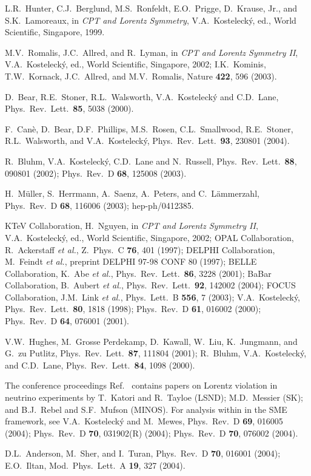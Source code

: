 \documentclass[twocolumn]{revtex4}
\def\etal {{\it et al.}}
\begin{document}
\begin{thebibliography}{99}
L.R.\ Hunter, C.J.\ Berglund, M.S.\ Ronfeldt, E.O.\ Prigge,
D.\ Krause, Jr., and S.K.\ Lamoreaux,
in
{\it CPT and Lorentz Symmetry},
V.A.\ Kosteleck\'y, ed.,
World Scientific, Singapore, 1999.

M.V.\ Romalis, J.C.\ Allred, and R.\ Lyman,
in
{\it CPT and Lorentz Symmetry II},
V.A.\ Kosteleck\'y, ed.,
World Scientific, Singapore, 2002;
I.K.\ Kominis, T.W.\ Kornack, J.C.\ Allred, and M.V.\ Romalis,
Nature {\bf 422}, 596 (2003).

D.\ Bear, R.E.\ Stoner, R.L.\ Walsworth, V.A.\ Kosteleck\'y and
C.D.\ Lane,
Phys.\ Rev.\ Lett.\  {\bf 85}, 5038 (2000).

F.\ Can\`e, D.\ Bear, D.F.\ Phillips, M.S.\ Rosen, C.L.\ Smallwood,
R.E.\ Stoner, R.L.\ Walsworth, and V.A.\ Kosteleck\'y,
Phys.\ Rev.\ Lett.\  {\bf 93}, 230801 (2004).

R.\ Bluhm, V.A.\ Kosteleck\'y, C.D.\ Lane and N.\ Russell,
Phys.\ Rev.\ Lett.\  {\bf 88}, 090801 (2002);
Phys.\ Rev.\ D {\bf 68}, 125008 (2003).

H.\ M\"uller, S.\ Herrmann, A.\ Saenz, A.\ Peters, and C.\ L\"ammerzahl,
Phys.\ Rev.\ D {\bf 68}, 116006 (2003);
hep-ph/0412385.

KTeV Collaboration,
H.\ Nguyen,
in
{\it CPT and Lorentz Symmetry II},
V.A.\ Kosteleck\'y, ed.,
World Scientific, Singapore, 2002;
OPAL Collaboration,
R.\ Ackerstaff \etal,
Z.\ Phys.\ C {\bf 76}, 401 (1997);
DELPHI Collaboration,
M.\ Feindt \etal,
preprint DELPHI 97-98 CONF 80 (1997);
BELLE Collaboration,
K.\ Abe \etal,
Phys.\ Rev.\ Lett.\ {\bf 86}, 3228 (2001);
BaBar Collaboration,
B.\ Aubert \etal,
Phys.\ Rev.\ Lett.\ {\bf 92}, 142002 (2004);
FOCUS Collaboration,
J.M.\ Link \etal,
Phys.\ Lett.\ B {\bf 556}, 7 (2003);
V.A.\ Kosteleck\'y,
Phys.\ Rev.\ Lett.\ {\bf 80}, 1818 (1998);
Phys.\ Rev.\ D {\bf 61}, 016002 (2000);
Phys.\ Rev.\ D {\bf 64}, 076001 (2001).

V.W.\ Hughes, M.\ Grosse Perdekamp, D.\ Kawall, W.\ Liu,
K.\ Jungmann, and G.\ zu Putlitz,
Phys.\ Rev.\ Lett.\ {\bf 87}, 111804 (2001);
R.\ Bluhm, V.A.\ Kosteleck\'y, and C.D.\ Lane,
Phys.\ Rev.\ Lett.\ {\bf 84}, 1098 (2000).

The conference proceedings Ref.\ \cite{cpt04}
contains papers on Lorentz violation
in neutrino experiments
by
T.\ Katori and R.\ Tayloe (LSND);
M.D.\ Messier (SK);
and B.J.\ Rebel and S.F.\ Mufson (MINOS).
For analysis within in the SME framework, see
V.A.\ Kosteleck\'y and M.\ Mewes,
Phys.\ Rev.\ D {\bf 69}, 016005 (2004);
Phys.\ Rev.\ D {\bf 70}, 031902(R) (2004);
Phys.\ Rev.\ D {\bf 70}, 076002 (2004).

D.L.\ Anderson, M.\ Sher, and I.\ Turan,
Phys.\ Rev.\ D {\bf 70}, 016001 (2004);
E.O.\ Iltan,
Mod.\ Phys.\ Lett.\ A {\bf 19}, 327 (2004).

\end{thebibliography}
\end{document}
